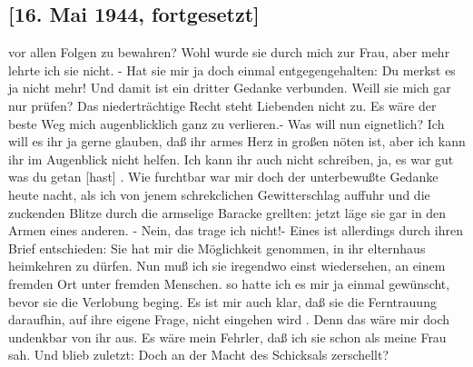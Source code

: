 \subsection{{\color{red} [16. Mai 1944, fortgesetzt] }}

vor allen Folgen zu bewahren?
Wohl wurde sie durch mich zur Frau, aber mehr lehrte ich sie nicht.
- Hat sie mir ja doch einmal entgegengehalten: Du merkst es ja nicht mehr!
Und damit ist  ein dritter Gedanke verbunden.
Weill sie mich gar nur pr\"{u}fen?
Das niedertr\"{a}chtige Recht steht Liebenden nicht zu.
Es w\"{a}re der beste Weg mich augenblicklich ganz zu verlieren.-
Was will nun eignetlich?
Ich will es ihr ja gerne glauben, da{\ss} ihr armes Herz in gro{\ss}en n\"{o}ten ist, aber ich kann ihr im Augenblick nicht helfen.
Ich kann ihr auch nicht schreiben, ja, es war gut was du getan {\color{red} [hast] }.
Wie furchtbar war mir doch der unterbewu{\ss}te Gedanke heute nacht, als ich von jenem schrekclichen Gewitterschlag auffuhr und die zuckenden Blitze durch die armselige Baracke grellten: jetzt l\"{a}ge sie gar in den Armen eines anderen.
- Nein, das trage ich nicht!-
Eines ist allerdings durch ihren Brief entschieden: Sie hat mir die M\"{o}glichkeit genommen, in ihr elternhaus heimkehren zu d\"{u}rfen.
Nun mu{\ss} ich sie iregendwo einst wiedersehen, an einem fremden Ort unter fremden Menschen.
so hatte ich es mir ja einmal gew\"{u}nscht, bevor sie die Verlobung beging.
Es ist mir auch klar, da{\ss} sie die Ferntrauung daraufhin, auf ihre eigene Frage, nicht eingehen wird
.
Denn das w\"{a}re mir doch undenkbar von ihr aus.
Es w\"{a}re mein Fehrler, da{\ss} ich  sie schon als meine Frau sah.
Und blieb zuletzt: Doch an der Macht des Schicksals zerschellt?

\clearpage
